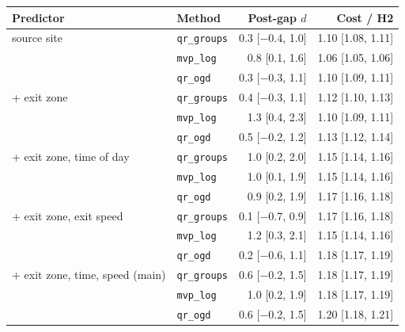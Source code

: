 \setlength{\tabcolsep}{3.0pt}
\begin{tabular}{@{}llrr@{}}
\toprule
Predictor & Method & Post-gap $d$ & Cost / H2 \\
\midrule
source site & \texttt{qr\_groups} & 0.3 [$-$0.4, 1.0] & 1.10 [1.08, 1.11] \\
 & \texttt{mvp\_log} & 0.8 [0.1, 1.6] & 1.06 [1.05, 1.06] \\
 & \texttt{qr\_ogd} & 0.3 [$-$0.3, 1.1] & 1.10 [1.09, 1.11] \\
\addlinespace
+ exit zone & \texttt{qr\_groups} & 0.4 [$-$0.3, 1.1] & 1.12 [1.10, 1.13] \\
 & \texttt{mvp\_log} & 1.3 [0.4, 2.3] & 1.10 [1.09, 1.11] \\
 & \texttt{qr\_ogd} & 0.5 [$-$0.2, 1.2] & 1.13 [1.12, 1.14] \\
\addlinespace
+ exit zone, time of day & \texttt{qr\_groups} & 1.0 [0.2, 2.0] & 1.15 [1.14, 1.16] \\
 & \texttt{mvp\_log} & 1.0 [0.1, 1.9] & 1.15 [1.14, 1.16] \\
 & \texttt{qr\_ogd} & 0.9 [0.2, 1.9] & 1.17 [1.16, 1.18] \\
\addlinespace
+ exit zone, exit speed & \texttt{qr\_groups} & 0.1 [$-$0.7, 0.9] & 1.17 [1.16, 1.18] \\
 & \texttt{mvp\_log} & 1.2 [0.3, 2.1] & 1.15 [1.14, 1.16] \\
 & \texttt{qr\_ogd} & 0.2 [$-$0.6, 1.1] & 1.18 [1.17, 1.19] \\
\addlinespace
+ exit zone, time, speed (main) & \texttt{qr\_groups} & 0.6 [$-$0.2, 1.5] & 1.18 [1.17, 1.19] \\
 & \texttt{mvp\_log} & 1.0 [0.2, 1.9] & 1.18 [1.17, 1.19] \\
 & \texttt{qr\_ogd} & 0.6 [$-$0.2, 1.5] & 1.20 [1.18, 1.21] \\
\bottomrule
\end{tabular}
